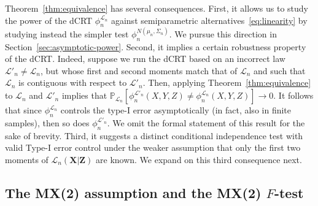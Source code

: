 \documentclass[ejs]{imsart}
\numberwithin{equation}{section}
\theoremstyle{plain}
\theoremstyle{definition}
\theoremstyle{remark}
\newcommand{\prx}{\bm X}
\newcommand{\srx}{X}
\newcommand{\prz}{\bm Z}
\newcommand{\srz}{Z}
\newcommand{\sry}{Y}
\begin{document}
Theorem~\ref{thm:equivalence} has several consequences. First, it allows us to study the power of the dCRT $\phi_n^{\mathcal L_n}$ against semiparametric alternatives~\eqref{eq:linearity} by studying instead the simpler test $\phi_n^{N(\mu_n, \Sigma_n)}$. We pursue this direction in Section~\ref{sec:asymptotic-power}. Second, it implies a certain robustness property of the dCRT. Indeed, suppose we run the dCRT based on an incorrect law $\mathcal L'_n \neq \mathcal L_n$, but whose first and second moments match that of $\mathcal L_n$ and such that $\mathcal L_n$ is contiguous with respect to $\mathcal L'_n$. Then, applying Theorem~\ref{thm:equivalence} to $\mathcal L_n$ and $\mathcal L'_n$ implies that $\mathbb P_{\mathcal L_n}[\phi^{\mathcal L'_n}_n(\srx, \sry, \srz) \neq \phi^{\mathcal L_n}_n(\srx, \sry, \srz)] \rightarrow 0$. It follows that since $\phi^{\mathcal L_n}_n$ controls the type-I error asymptotically (in fact, also in finite samples), then so does $\phi^{\mathcal L'_n}_n$. We omit the formal statement of this result for the sake of brevity. Third, it suggests a distinct conditional independence test with valid Type-I error control under the weaker assumption that only the first two moments of $\mathcal L_n(\prx|\prz)$ are known. We expand on this third consequence next.

\subsection{The MX(2) assumption and the MX(2) $F$-test} \label{sec:mx2-f-test}
\end{document}
